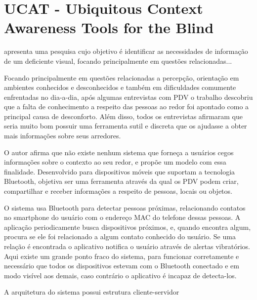 \documentclass[english,brazilian]{UNISINOSmonografia}
\begin{document}
	\section{UCAT - Ubiquitous Context Awareness Tools for the Blind}
 apresenta uma pesquisa cujo objetivo é identificar as necessidades de informação de um deficiente visual, focando principalmente em questões relacionadas...


Focando principalmente em questões relacionadas a percepção, orientação em ambientes conhecidos e desconhecidos e também em dificuldades comumente enfrentadas no dia-a-dia, após algumas entrevistas com PDV o trabalho descobriu que a falta de conhecimento a respeito das pessoas ao redor foi apontado como a principal causa de desconforto. Além disso, todos os entrevistas afirmaram que seria muito bom possuir uma ferramenta sutil e discreta que os ajudasse a obter mais informações sobre seus arredores.

O autor afirma que não existe nenhum sistema que forneça a usuários cegos informações sobre o contexto ao seu redor, e propõe um modelo com essa finalidade. Desenvolvido para dispositivos móveis que suportam a tecnologia Bluetooth, objetiva ser uma ferramenta através da qual os PDV podem criar, compartilhar e receber informações a respeito de pessoas, locais ou objetos.

O sistema usa Bluetooth para detectar pessoas próximas, relacionando contatos no smartphone do usuário com o endereço MAC do telefone dessas pessoas. A aplicação periodicamente busca dispositivos próximos, e, quando encontra algum, procura se ele foi relacionado a algum contato conhecido do usuário. Se uma relação é encontrada o aplicativo notifica o usuário através de alertas vibratórios. Aqui existe um grande ponto fraco do sistema, para funcionar corretamente 
e necessário que todos os dispositivos estevam com o Bluetooth conectado e em modo visível aos demais, caso contrário o aplicativo é incapaz de detecta-los.

A arquitetura do sistema possui estrutura cliente-servidor
\end{document}
